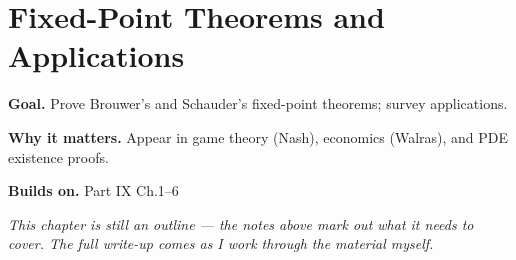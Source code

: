 \chapter{Fixed-Point Theorems and Applications}
\label{ch:09-topology-09}

\begin{chapterintro}
\textbf{Goal.} Prove Brouwer's and Schauder's fixed-point theorems; survey applications.

\textbf{Why it matters.} Appear in game theory (Nash), economics (Walras), and PDE existence proofs.

\textbf{Builds on.} Part IX Ch.1–6
\end{chapterintro}

\textit{This chapter is still an outline --- the notes above mark out what it needs to cover. The full write-up comes as I work through the material myself.}
